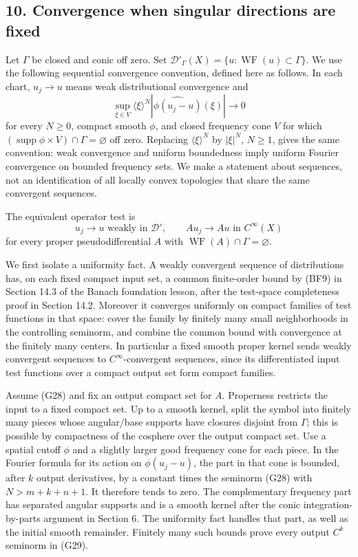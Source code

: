 \documentclass[
  11pt,
]{article}
\begin{document}
\subsection{10. Convergence when singular directions are
fixed}\label{convergence-when-singular-directions-are-fixed}

Let \(\Gamma\) be closed and conic off zero. Set
\(\mathcal D'_\Gamma(X)=\{u:\operatorname{WF}(u)\subset\Gamma\}\). We
use the following sequential convergence convention, defined here as
follows. In each chart, \(u_j\to u\) means weak distributional
convergence and \[
\sup_{\xi\in V}\langle\xi\rangle^N
|\widehat{\phi(u_j-u)}(\xi)|\longrightarrow0
\tag{G28}
\] for every \(N\geq0\), compact smooth \(\phi\), and closed frequency
cone \(V\) for which
\((\operatorname{supp}\phi\times V)\cap\Gamma=\varnothing\) off zero.
Replacing \(\langle\xi\rangle^N\) by \(|\xi|^N\), \(N\geq1\), gives the
same convention: weak convergence and uniform boundedness imply uniform
Fourier convergence on bounded frequency sets. We make a statement about
sequences, not an identification of all locally convex topologies that
share the same convergent sequences.

The equivalent operator test is \[
u_j\longrightarrow u\text{ weakly in }\mathcal D',
\qquad
Au_j\longrightarrow Au\text{ in }C^\infty(X)
\tag{G29}
\] for every proper pseudodifferential \(A\) with
\(\operatorname{WF}(A)\cap\Gamma=\varnothing\).

We first isolate a uniformity fact. A weakly convergent sequence of
distributions has, on each fixed compact input set, a common
finite-order bound by (BF9) in Section 14.3 of the Banach foundation
lesson, after the test-space completeness proof in Section 14.2.
Moreover it converges uniformly on compact families of test functions in
that space: cover the family by finitely many small neighborhoods in the
controlling seminorm, and combine the common bound with convergence at
the finitely many centers. In particular a fixed smooth proper kernel
sends weakly convergent sequences to \(C^\infty\)-convergent sequences,
since its differentiated input test functions over a compact output set
form compact families.

Assume (G28) and fix an output compact set for \(A\). Properness
restricts the input to a fixed compact set. Up to a smooth kernel, split
the symbol into finitely many pieces whose angular/base supports have
closures disjoint from \(\Gamma\); this is possible by compactness of
the cosphere over the output compact set. Use a spatial cutoff \(\phi\)
and a slightly larger good frequency cone for each piece. In the Fourier
formula for its action on \(\phi(u_j-u)\), the part in that cone is
bounded, after \(k\) output derivatives, by a constant times the
seminorm (G28) with \(N>m+k+n+1\). It therefore tends to zero. The
complementary frequency part has separated angular supports and is a
smooth kernel after the conic integration-by-parts argument in Section
6. The uniformity fact handles that part, as well as the initial smooth
remainder. Finitely many such bounds prove every output \(C^k\) seminorm
in (G29).
\end{document}
